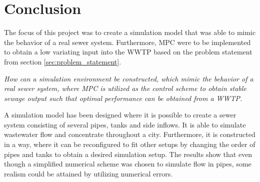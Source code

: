 

\chapter{Conclusion}\label{ch:conclusion}

The focus of this project was to create a simulation model that was able to mimic the behavior of a real sewer system. Furthermore, MPC were to be implemented to obtain a low variating input into the WWTP based on the problem statement from section \ref{sec:problem_statement}. 

\begin{center}
\textit{How can a simulation environment be constructed, which mimic the behavior of a real sewer system, where MPC is utilized as the control scheme to obtain stable sewage output such that optimal performance can be obtained from a WWTP.}
\end{center}


A simulation model has been designed where it is possible to create a sewer system consisting of several pipes, tanks and side inflows. It is able to simulate wastewater flow and concentrate throughout a city. Furthermore, it is constructed in a way, where it can be reconfigured to fit other setups by changing the order of pipes and tanks to obtain a desired simulation setup. 
The results show that even though a simplified numerical scheme was chosen to simulate flow in pipes, some realism could be attained by utilizing numerical errors.

